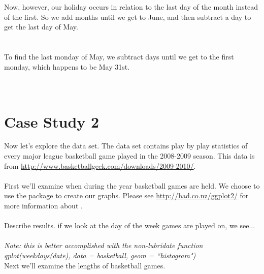 \documentclass[article]{jss}
\begin{document}
Now, however, our holiday occurs in relation to the last day of the month instead of the first. So we add months until we get to June, and then subtract a day to get the last day of May.\\

\\
\\

To find the last monday of May, we subtract days until we get to the first monday, which happens to be May 31st.\\

\\
\\


\section{Case Study 2}
Now let's explore the  data set. The  data set contains play by play statistics of every major league basketball game played in the 2008-2009 season. This data is from \url{http://www.basketballgeek.com/downloads/2009-2010/}. \\

\\

First we'll examine when during the year basketball games are held. We choose to use the  package to create our graphs. Please see \url{http://had.co.nz/ggplot2/} for more information about .\\

\\

Describe results. if we look at the day of the week games are played on, we see...\\

\\
\emph{Note: this is better accomplished with the non-lubridate function qplot(weekdays(date), data = basketball, geom = ``histogram")}\\

Next we'll examine the lengths of basketball games.\\

\\
\\
\end{document}

